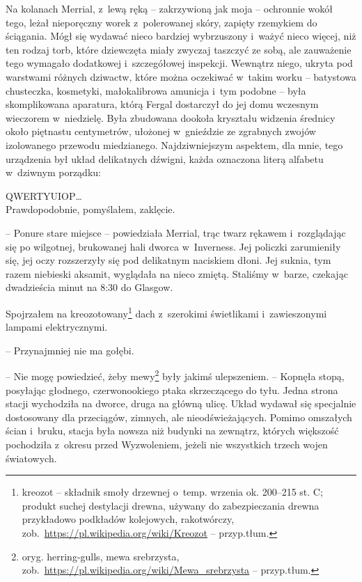 \documentclass[oneside,polish,11pt,sfheadings]{mwbk}
\begin{document}
Na kolanach Merrial, z~lewą ręką -- zakrzywioną jak moja -- ochronnie
wokół tego, leżał nieporęczny worek z~polerowanej skóry, zapięty
rzemykiem do ściągania. Mógł się wydawać nieco bardziej wybrzuszony i~ważyć nieco więcej, niż ten rodzaj torb, które dziewczęta miały zwyczaj
taszczyć ze sobą, ale zauważenie tego wymagało dodatkowej i~szczegółowej
inspekcji. Wewnątrz niego, ukryta pod warstwami różnych dziwactw, które
można oczekiwać w~takim worku -- batystowa chusteczka, kosmetyki,
małokalibrowa amunicja i~tym podobne -- była skomplikowana aparatura,
którą Fergal dostarczył do jej domu wczesnym wieczorem w~niedzielę. Była
zbudowana dookoła kryształu widzenia średnicy około piętnastu
centymetrów, ułożonej w~gnieździe ze zgrabnych zwojów izolowanego
przewodu miedzianego. Najdziwniejszym aspektem, dla mnie, tego
urządzenia był układ delikatnych dźwigni, każda oznaczona literą
alfabetu w~dziwnym porządku:

QWERTYUIOP\ldots\\
Prawdopodobnie, pomyślałem, zaklęcie.

-- Ponure stare miejsce -- powiedziała Merrial, trąc twarz rękawem i~rozglądając się po wilgotnej, brukowanej hali dworca w~Inverness. Jej
policzki zarumieniły się, jej oczy rozszerzyły się pod delikatnym
naciskiem dłoni. Jej suknia, tym razem niebieski aksamit, wyglądała na
nieco zmiętą. Staliśmy w~barze, czekając dwadzieścia minut na 8:30 do
Glasgow.

Spojrzałem na kreozotowany\footnote{ kreozot -- składnik smoły drzewnej o~temp.
wrzenia ok. 200--215 st. C; produkt suchej destylacji drewna, używany do
zabezpieczania drewna przykładowo podkładów kolejowych, rakotwórczy,
zob.~\url{https://pl.wikipedia.org/wiki/Kreozot} -- przyp.tłum.} dach z~szerokimi świetlikami i~zawieszonymi lampami
elektrycznymi. 

-- Przynajmniej nie ma gołębi.

-- Nie mogę powiedzieć, żeby mewy\footnote{ oryg. herring-gulls, mewa
srebrzysta,
zob.~\url{https://pl.wikipedia.org/wiki/Mewa\_srebrzysta} -- przyp.tłum.} były jakimś ulepszeniem. -- Kopnęła stopą, posyłając
głodnego, czerwonookiego ptaka skrzeczącego do tyłu. Jedna strona stacji
wychodziła na dworce, druga na główną ulicę. Układ wydawał się
specjalnie dostosowany dla przeciągów, zimnych, ale nieodświeżających.
Pomimo omszałych ścian i~bruku, stacja była nowsza niż budynki na
zewnątrz, których większość pochodziła z~okresu przed Wyzwoleniem,
jeżeli nie wszystkich trzech wojen światowych.
\end{document}
